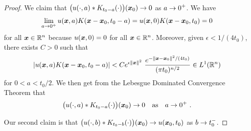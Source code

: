 \begin{proof}
 We claim that
$\displaystyle \big(u(\cdot, a) \ast K_{t_0-a}(\cdot)\big)({\bm{x}}_0) \to 0$
as $\displaystyle a \to 0^+$.  We have
\[
\lim_{a\to 0^+} u({\bm{x}},a) K({\bm{x}}-{\bm{x}}_0, t_0 - a) =
u({\bm{x}},0) K({\bm{x}}-{\bm{x}}_0, t_0) = 0
\]
for all $\displaystyle {\bm{x}} \in \mathbb{R}^n$ because $u({\bm{x}},0) = 0$
for all ${\bm{x}} \in \mathbb{R}^n$.  Moreover, given
$\epsilon < 1/(4t_0)$, there exists $C>0$ such that
\[
\left| u({\bm{x}},a) K({\bm{x}}-{\bm{x}}_0, t_0 - a) \right|
< C e^{\epsilon \|{\bm{x}}\|^2}
\ \frac{e^{-\|{\bm{x}}-{\bm{x}}_0\|^2/(4t_0)}}{(\pi t_0)^{n/2}} \in L^1(\mathbb{R}^n)
\]
for $0<a< t_0/2$.  We then get from the
Lebesgue Dominated Convergence Theorem that
\begin{equation} \label{heat_unicC}
\big(u(\cdot, a) \ast K_{t_0-a}(\cdot)\big)({\bm{x}}_0)
\to 0 \quad \text{as}\quad a \to 0^+ \ .
\end{equation}

 Our second claim is that
$\displaystyle \big(u(\cdot, b) \ast K_{t_0-b}(\cdot)\big)({\bm{x}}_0) \to
u({\bm{x}}_0,t_0)$ as $\displaystyle b \to t_0^-$.


\end{proof}
